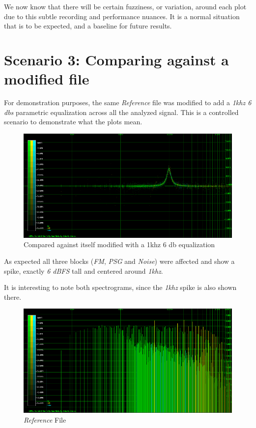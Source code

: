 \documentclass[10pt,a4paper]{report}
\begin{document}
We now know that there will be certain fuzziness, or variation, around each plot due to this subtle recording and performance nuances. It is a normal situation that is to be expected, and a baseline for future results.

\section{Scenario 3: Comparing against a modified file}

For demonstration purposes, the same \textit{Reference} file was modified to add a \textit{1khz 6 dbs} parametric equalization across all the analyzed signal. This is a controlled scenario to demonstrate what the plots mean.

\begin{figure}[H]
	\centering
	\includegraphics[width=1.0\linewidth]{plots/Plot3-Modified}
	\caption[1khz modified]{Compared against itself modified with a 1khz 6 db equalization}
	\label{fig:plot3-modified}
\end{figure}

As expected all three blocks (\textit{FM}, \textit{PSG} and \textit{Noise}) were affected and show a spike, exactly \textit{6 dBFS} tall and centered around \textit{1khz}.

It is interesting to note both spectrograms, since the \textit{1khz} spike is also shown there.

\begin{figure}[H]
	\centering
	\includegraphics[width=1.0\linewidth]{plots/Plot3-Spectrogram}
	\caption[Reference File]{\textit{Reference} File}
	\label{fig:plot3-spectrogram}
\end{figure}
\end{document}
